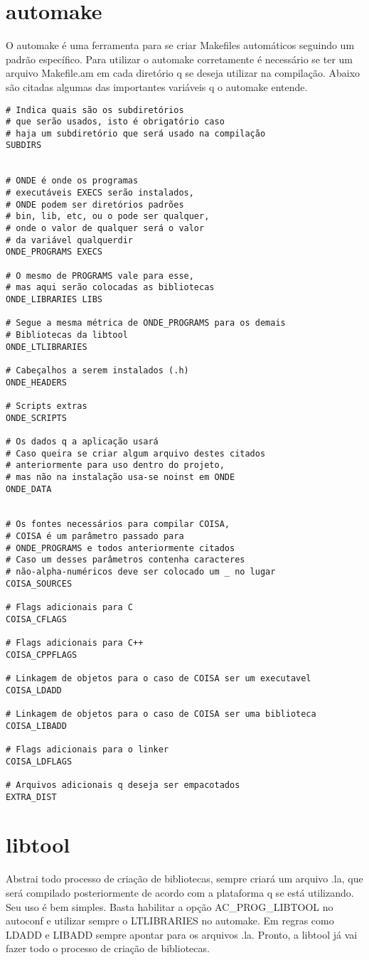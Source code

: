 \documentclass[]{article}
\begin{document}
\section{automake}
O automake é uma ferramenta para se criar Makefiles automáticos seguindo um padrão específico.
Para utilizar o automake corretamente é necessário se ter um arquivo Makefile.am em cada diretório q se deseja utilizar na compilação.
Abaixo são citadas algumas das importantes variáveis q o automake entende.
\begin{verbatim}
# Indica quais são os subdiretórios
# que serão usados, isto é obrigatório caso
# haja um subdiretório que será usado na compilação
SUBDIRS


# ONDE é onde os programas
# executáveis EXECS serão instalados,
# ONDE podem ser diretórios padrões
# bin, lib, etc, ou o pode ser qualquer,
# onde o valor de qualquer será o valor
# da variável qualquerdir
ONDE_PROGRAMS EXECS

# O mesmo de PROGRAMS vale para esse,
# mas aqui serão colocadas as bibliotecas
ONDE_LIBRARIES LIBS

# Segue a mesma métrica de ONDE_PROGRAMS para os demais
# Bibliotecas da libtool
ONDE_LTLIBRARIES

# Cabeçalhos a serem instalados (.h)
ONDE_HEADERS

# Scripts extras
ONDE_SCRIPTS

# Os dados q a aplicação usará
# Caso queira se criar algum arquivo destes citados 
# anteriormente para uso dentro do projeto,
# mas não na instalação usa-se noinst em ONDE
ONDE_DATA


# Os fontes necessários para compilar COISA,
# COISA é um parâmetro passado para 
# ONDE_PROGRAMS e todos anteriormente citados
# Caso um desses parâmetros contenha caracteres
# não-alpha-numéricos deve ser colocado um _ no lugar
COISA_SOURCES

# Flags adicionais para C
COISA_CFLAGS

# Flags adicionais para C++
COISA_CPPFLAGS

# Linkagem de objetos para o caso de COISA ser um executavel
COISA_LDADD

# Linkagem de objetos para o caso de COISA ser uma biblioteca
COISA_LIBADD

# Flags adicionais para o linker
COISA_LDFLAGS

# Arquivos adicionais q deseja ser empacotados
EXTRA_DIST
\end{verbatim}

\section{libtool}
Abstrai todo processo de criação de bibliotecas, sempre criará um arquivo .la, que será compilado posteriormente de acordo com a plataforma q se está utilizando.
Seu uso é bem simples.
Basta habilitar a opção AC\_PROG\_LIBTOOL no autoconf e utilizar sempre o LTLIBRARIES no automake.
Em regras como LDADD e LIBADD sempre apontar para os arquivos .la. Pronto, a libtool já vai fazer todo o processo de criação de bibliotecas.
\end{document}
